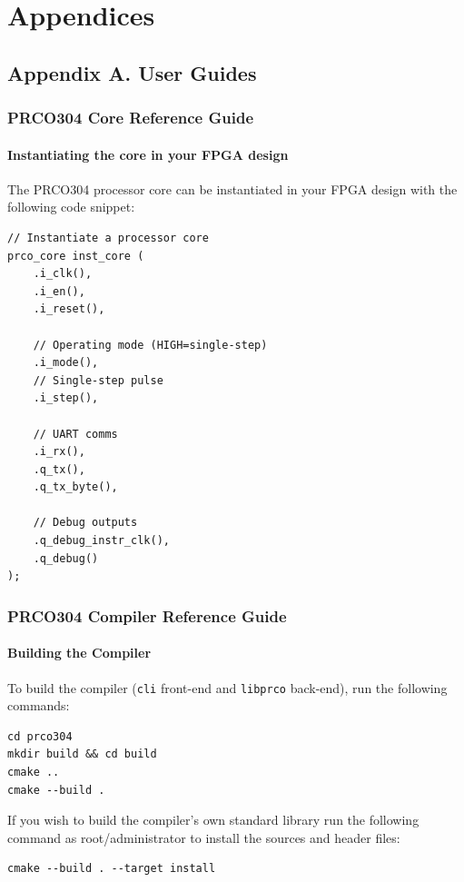 \documentclass[11pt,a4paper]{report}
\newcommand{\scname}{PRCO304}
\begin{document}
\newpage




\newpage
\chapter{Appendices}
{\hypersetup{linkcolor=black}
\startcontents[chapters]
}

\section{Appendix A. User Guides}
\subsection{\scname{} Core Reference Guide}
\subsubsection*{Instantiating the core in your FPGA design}
The \scname{} processor core can be instantiated in your FPGA design with the following code snippet:
\begin{verbatim}
// Instantiate a processor core
prco_core inst_core (
    .i_clk(), 
    .i_en(), 
    .i_reset(),
    
    // Operating mode (HIGH=single-step)
    .i_mode(),
    // Single-step pulse
    .i_step(),
    
    // UART comms
    .i_rx(),
    .q_tx(),
    .q_tx_byte(),
    
    // Debug outputs
    .q_debug_instr_clk(),
    .q_debug()
);
\end{verbatim}


\subsection{\scname{} Compiler Reference Guide}
\subsubsection*{Building the Compiler}
To build the compiler (\verb|cli| front-end and \verb|libprco| back-end), run the following commands:
\begin{verbatim}
cd prco304
mkdir build && cd build
cmake ..
cmake --build .
\end{verbatim}
If you wish to build the compiler's own standard library run the following command as root/administrator to install the sources and header files:
\begin{verbatim}
cmake --build . --target install
\end{verbatim}
\end{document}
